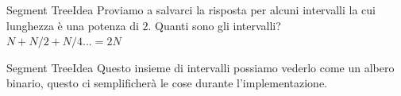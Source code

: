 \documentclass[compress]{beamer}
\begin{document}
\begin{frame}{Segment Tree}{Idea}
    Proviamo a salvarci la risposta per alcuni intervalli la cui lunghezza è una potenza di $2$.    
    \vfill
    \vfill
    \pause
    Quanti sono gli intervalli? \\
    $N + N/2 +N/4 ... = 2N$ \\
\end{frame}


\begin{frame}{Segment Tree}{Idea}
    Questo insieme di intervalli possiamo vederlo come un albero binario, questo ci semplificherà le cose durante l'implementazione.\\ 
    \vfill
\end{frame}
\end{document}
